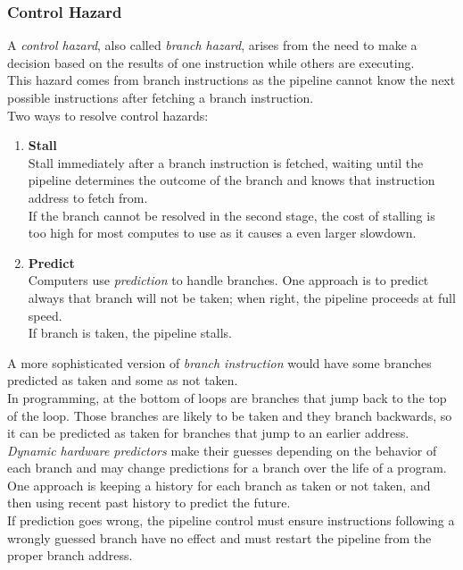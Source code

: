\documentclass[12pt]{article}
\theoremstyle{definition}
\begin{document}
  \subsubsection{Control Hazard}
  A \emph{control hazard}, also called \emph{branch hazard}, arises from the need to make a decision based on the results of one instruction while others are executing. \\
  This hazard comes from branch instructions as the pipeline cannot know the next possible instructions after fetching a branch instruction. \\
  Two ways to resolve control hazards:
  \begin{enumerate}
    \item \textbf{Stall} \\
      Stall immediately after a branch instruction is fetched, waiting until the pipeline determines the outcome of the branch and knows that instruction address to fetch from. \\
      If the branch cannot be resolved in the second stage, the cost of stalling is too high for most computes to use as it causes a even larger slowdown.
    \item \textbf{Predict} \\
      Computers use \emph{prediction} to handle branches.
      One approach is to predict always that branch will not be taken; when right,  the pipeline proceeds at full speed. \\
      If branch is taken, the pipeline stalls.
  \end{enumerate}

  A more sophisticated version of \emph{branch instruction} would have some branches predicted as taken and some as not taken. \\
  In programming, at the bottom of loops are branches that jump back to the top of the loop.
  Those branches are likely to be taken and they branch backwards, so it can be predicted as taken for branches that jump to an earlier address. \\
  \emph{Dynamic hardware predictors} make their guesses depending on the behavior of each branch and may change predictions for a branch over the life of a program.
  One approach is keeping a history for each branch as taken or not taken, and then using recent past history to predict the future. \\
  If prediction goes wrong, the pipeline control must ensure instructions following a wrongly guessed branch have no effect and must restart the pipeline from the proper branch address. \\
\end{document}
